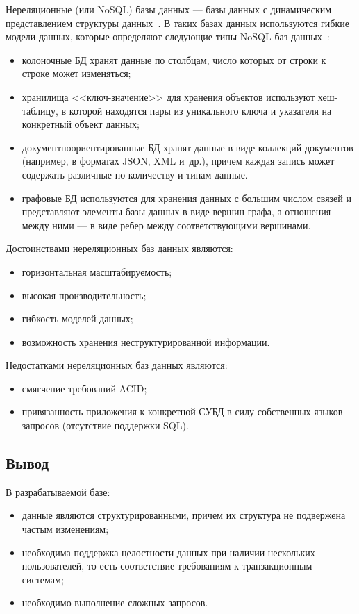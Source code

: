 Нереляционные (или NoSQL) базы данных --- базы данных с динамическим
представлением структуры данных~\cite{art04}. В таких базах данных используются
гибкие модели данных, которые определяют следующие типы NoSQL баз
данных~\cite{art05}:
\begin{itemize}
    \item колоночные БД хранят данные по столбцам, число которых от строки к
        строке может изменяться;
    \item хранилища <<ключ-значение>> для хранения объектов используют
        хеш-таблицу, в которой находятся пары из уникального ключа и
        указателя на конкретный объект данных;
    \item документноориентированные БД хранят данные в виде коллекций
        документов (например, в форматах JSON, XML и~др.), причем каждая
        запись может содержать различные по количеству и типам данные.
    \item графовые БД используются для хранения данных с большим числом
        связей и представляют элементы базы данных в виде вершин графа, а
        отношения между ними --- в виде ребер между соответствующими
        вершинами.
\end{itemize}

Достоинствами нереляционных баз данных являются:
\begin{itemize}
    \item горизонтальная масштабируемость;
    \item  высокая производительность;
    \item гибкость моделей данных;
    \item возможность хранения неструктурированной информации.
\end{itemize}

Недостатками нереляционных баз данных являются:
\begin{itemize}
    \item смягчение требований ACID;
    \item привязанность приложения к конкретной СУБД в силу собственных
        языков запросов (отсутствие поддержки SQL).
\end{itemize}

\subsection*{Вывод}

В разрабатываемой базе:

\begin{itemize}
    \item данные являются структурированными, причем их структура не подвержена
        частым изменениям;
    \item необходима поддержка целостности данных при наличии нескольких
        пользователей, то есть соответствие требованиям к транзакционным
        системам;
    \item необходимо выполнение сложных запросов.
\end{itemize}

